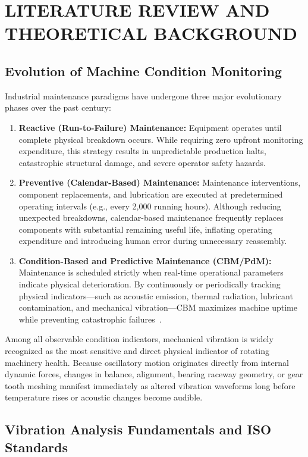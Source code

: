 \chapter{LITERATURE REVIEW AND THEORETICAL BACKGROUND}
\label{ch:lit_review}

\section{Evolution of Machine Condition Monitoring}
Industrial maintenance paradigms have undergone three major evolutionary phases over the past century:
\begin{enumerate}
    \item \textbf{Reactive (Run-to-Failure) Maintenance:} Equipment operates until complete physical breakdown occurs. While requiring zero upfront monitoring expenditure, this strategy results in unpredictable production halts, catastrophic structural damage, and severe operator safety hazards.
    \item \textbf{Preventive (Calendar-Based) Maintenance:} Maintenance interventions, component replacements, and lubrication are executed at predetermined operating intervals (e.g., every 2,000 running hours). Although reducing unexpected breakdowns, calendar-based maintenance frequently replaces components with substantial remaining useful life, inflating operating expenditure and introducing human error during unnecessary reassembly.
    \item \textbf{Condition-Based and Predictive Maintenance (CBM/PdM):} Maintenance is scheduled strictly when real-time operational parameters indicate physical deterioration. By continuously or periodically tracking physical indicators---such as acoustic emission, thermal radiation, lubricant contamination, and mechanical vibration---CBM maximizes machine uptime while preventing catastrophic failures~\cite{randall2011vibration}.
\end{enumerate}

Among all observable condition indicators, mechanical vibration is widely recognized as the most sensitive and direct physical indicator of rotating machinery health. Because oscillatory motion originates directly from internal dynamic forces, changes in balance, alignment, bearing raceway geometry, or gear tooth meshing manifest immediately as altered vibration waveforms long before temperature rises or acoustic changes become audible.

\section{Vibration Analysis Fundamentals and ISO Standards}
